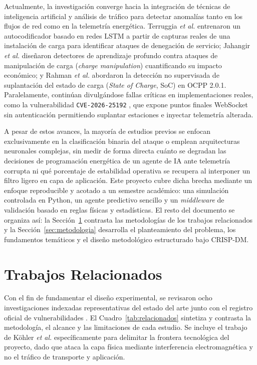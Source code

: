 \documentclass[conference]{IEEEtran}
\begin{document}
Actualmente, la investigación converge hacia la integración de técnicas de inteligencia artificial y análisis de tráfico para detectar anomalías tanto en los flujos de red como en la telemetría energética. Terruggia \textit{et al.} \cite{terruggia2025} entrenaron un autocodificador basado en redes LSTM a partir de capturas reales de una instalación de carga para identificar ataques de denegación de servicio; Jahangir \textit{et al.} \cite{jahangir2024} diseñaron detectores de aprendizaje profundo contra ataques de manipulación de carga (\textit{charge manipulation}) cuantificando su impacto económico; y Rahman \textit{et al.} \cite{rahman2026} abordaron la detección no supervisada de suplantación del estado de carga (\textit{State of Charge}, SoC) en OCPP 2.0.1. Paralelamente, continúan divulgándose fallas críticas en implementaciones reales, como la vulnerabilidad \texttt{CVE-2026-25192} \cite{nist2026}, que expone puntos finales WebSocket sin autenticación permitiendo suplantar estaciones e inyectar telemetría alterada.

A pesar de estos avances, la mayoría de estudios previos se enfocan exclusivamente en la clasificación binaria del ataque o emplean arquitecturas neuronales complejas, sin medir de forma directa cuánto se degradan las decisiones de programación energética de un agente de IA ante telemetría corrupta ni qué porcentaje de estabilidad operativa se recupera al interponer un filtro ligero en capa de aplicación. Este proyecto cubre dicha brecha mediante un enfoque reproducible y acotado a un semestre académico: una simulación controlada en Python, un agente predictivo sencillo y un \textit{middleware} de validación basado en reglas físicas y estadísticas. El resto del documento se organiza así: la Sección~\ref{sec:trabajos} contrasta las metodologías de los trabajos relacionados y la Sección~\ref{sec:metodologia} desarrolla el planteamiento del problema, los fundamentos temáticos y el diseño metodológico estructurado bajo CRISP-DM.

\section{Trabajos Relacionados}
\label{sec:trabajos}

Con el fin de fundamentar el diseño experimental, se revisaron ocho investigaciones indexadas representativas del estado del arte junto con el registro oficial de vulnerabilidades \cite{nist2026}. El Cuadro~\ref{tab:relacionados} sintetiza y contrasta la metodología, el alcance y las limitaciones de cada estudio. Se incluye el trabajo de Köhler \textit{et al.} \cite{kohler2023} específicamente para delimitar la frontera tecnológica del proyecto, dado que ataca la capa física mediante interferencia electromagnética y no el tráfico de transporte y aplicación.
\end{document}
